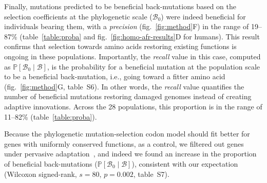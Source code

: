 \documentclass[9pt,twocolumn,twoside,lineno]{pnas-new}
\newcommand{\proba}{\mathbb{P}}
\newcommand{\SphyBen}{\mathcal{B}_0}
\newcommand{\given}{\mid}
\newcommand{\SpopBen}{\mathcal{B}}
\begin{document}
Finally, mutations predicted to be beneficial back-mutations based on the selection coefficients at the phylogenetic scale ($\SphyBen$) were indeed beneficial for individuals bearing them, with a \textit{precision} (fig.~\ref{fig:method}F) in the range of 19--87\% (table~\ref{table:proba} and fig.~\ref{fig:homo-afr-results}D for humans).
This result confirms that selection towards amino acids restoring existing functions is ongoing in these populations.
Importantly, the \textit{recall} value in this case, computed as $\proba [ \SphyBen  \given  \SpopBen]$, is the probability for a beneficial mutation at the population scale to be a beneficial back-mutation, i.e., going toward a fitter amino acid (fig.~\ref{fig:method}G, table~S6).
In other words, the \textit{recall} value quantifies the number of beneficial mutations restoring damaged genomes instead of creating adaptive innovations.
Across the 28 populations, this proportion is in the range of 11--82\% (table~\ref{table:proba}).

Because the phylogenetic mutation-selection codon model should fit better for genes with uniformly conserved functions, as a control, we filtered out genes under pervasive adaptation~\cite{latrille_genes_2023}, and indeed we found an increase in the proportion of beneficial back-mutations ($\proba [ \SphyBen  \given  \SpopBen]$), consistent with our expectation (Wilcoxon signed-rank, $s=80$, $p=0.002$, table~S7).
\end{document}
